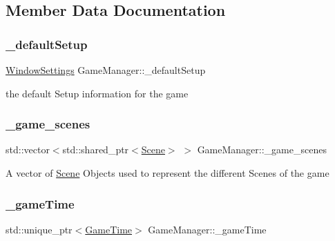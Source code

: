 \subsection{Member Data Documentation}
\mbox{\label{class_game_manager_a06843f28cb1609e41da7eee19be9aa87}} 
\subsubsection{\texorpdfstring{\+\_\+default\+Setup}{\_defaultSetup}}
{\footnotesize\ttfamily \hyperlink{struct_window_settings}{Window\+Settings} Game\+Manager\+::\+\_\+default\+Setup\hspace{0.3cm}{\ttfamily [private]}}

the default Setup information for the game \mbox{\label{class_game_manager_a6be6c6b38c1b95d7fd84819eba50e618}} 
\subsubsection{\texorpdfstring{\+\_\+game\+\_\+scenes}{\_game\_scenes}}
{\footnotesize\ttfamily std\+::vector$<$std\+::shared\+\_\+ptr$<$\hyperlink{class_scene}{Scene}$>$ $>$ Game\+Manager\+::\+\_\+game\+\_\+scenes\hspace{0.3cm}{\ttfamily [private]}}

A vector of \hyperlink{class_scene}{Scene} Objects used to represent the different Scenes of the game \mbox{\label{class_game_manager_ae08fe7df616e789e4858645b56d9b73b}} 
\subsubsection{\texorpdfstring{\+\_\+game\+Time}{\_gameTime}}
{\footnotesize\ttfamily std\+::unique\+\_\+ptr$<$\hyperlink{class_game_time}{Game\+Time}$>$ Game\+Manager\+::\+\_\+game\+Time\hspace{0.3cm}{\ttfamily [private]}}

